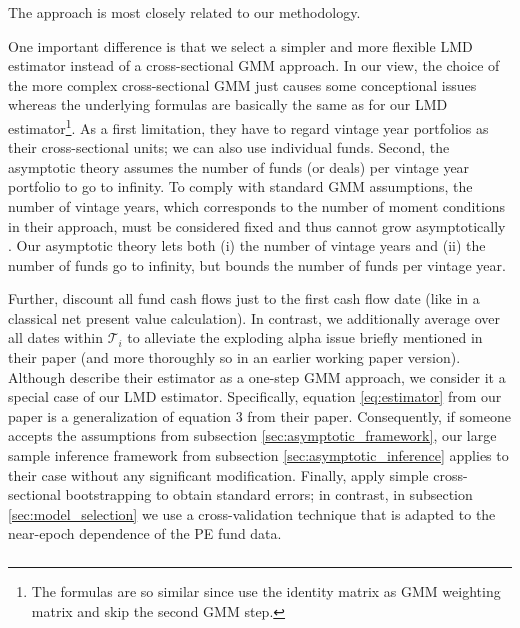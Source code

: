 \documentclass[12pt]{article}
\begin{document}
\subsubsection{\cite{DLP12}}

The \cite{DLP12} approach is most closely related to our methodology.

One important difference is that we select a simpler and more flexible LMD estimator instead of a cross-sectional GMM approach.
In our view, the choice of the more complex cross-sectional GMM just causes some conceptional issues whereas the underlying formulas are basically the same as for our LMD estimator\footnote{The formulas are so similar since \cite{DLP12} use the identity matrix as GMM weighting matrix and skip the second GMM step.}.
As a first limitation, they have to regard vintage year portfolios as their cross-sectional units; we can also use individual funds.
Second, the \cite{DLP12} asymptotic theory assumes the number of funds (or deals) per vintage year portfolio to go to infinity.
To comply with standard GMM assumptions, the number of vintage years, which corresponds to the number of moment conditions in their approach, must be considered fixed and thus cannot grow asymptotically \citep{NW09}.
Our asymptotic theory lets both (i) the number of vintage years and (ii) the number of funds go to infinity, but bounds the number of funds per vintage year.

Further, \cite{DLP12} discount all fund cash flows just to the first cash flow date (like in a classical net present value calculation).
In contrast, we additionally average over all dates within $\mathcal{T}_{i}$ to alleviate the exploding alpha issue briefly mentioned in their paper (and more thoroughly so in an earlier working paper version).
Although \cite{DLP12} describe their estimator as a one-step GMM approach, we consider it a special case of our LMD estimator.
Specifically, equation \ref{eq:estimator} from our paper is a generalization of equation 3 from their paper.
Consequently, if someone accepts the assumptions from subsection \ref{sec:asymptotic_framework}, our large sample inference framework from subsection \ref{sec:asymptotic_inference} applies to their case without any significant modification.
Finally, \cite{DLP12} apply simple cross-sectional bootstrapping to obtain standard errors; in contrast, in subsection \ref{sec:model_selection} we use a cross-validation technique that is adapted to the near-epoch dependence of the PE fund data.

\subsubsection{\cite{KN16}}
\end{document}
